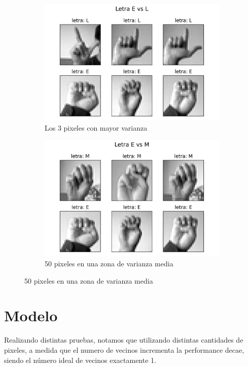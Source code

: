 \documentclass[10pt,a4paper]{article}
\begin{document}
\begin{figure}[ht!]
	\begin{subfigure}{0.5\textwidth}
		\includegraphics[width=0.9\linewidth]{Imagenes/letra_E_vs_L.png} 
		\caption{Los 3 pixeles con mayor varianza}
		\label{fig:subfig1}
	\end{subfigure}
	\begin{subfigure}{0.5\textwidth}
		\includegraphics[width=0.9\linewidth]{Imagenes/letra_E_vs_M.png}
		\caption{50 pixeles en una zona de varianza media}
		\label{fig:subfig2}
	\end{subfigure}
	\label{fig:subfigs}
\end{figure}

\section{Modelo}
Realizando distintas pruebas, notamos que utilizando distintas cantidades de pixeles, a medida que el numero de vecinos incrementa
la performance decae, siendo el número ideal de vecinos exactamente 1.
\end{document}

